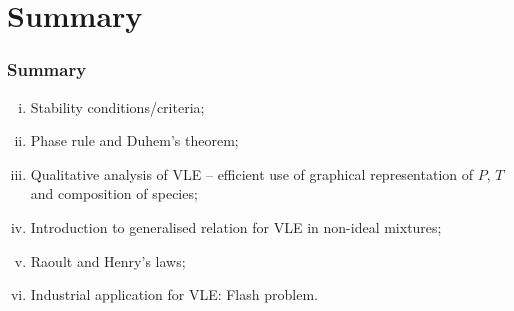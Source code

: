 \documentclass[10pt,compress,handout,ignorenonframetext,unknownkeysallowed]{beamer}
\begin{document}
\section{Summary}

\begin{frame}
 \frametitle{Summary}
   \begin{enumerate}[(i)]
     \item Stability conditions/criteria;
     \item Phase rule and Duhem's theorem;
     \item Qualitative analysis of VLE -- efficient use of graphical representation of $P$, $T$ and composition of species;
     \item Introduction to generalised relation for VLE in non-ideal mixtures;
     \item Raoult and Henry's laws; 
     \item Industrial application for VLE: Flash problem.
   \end{enumerate}
\end{frame}
\end{document}
